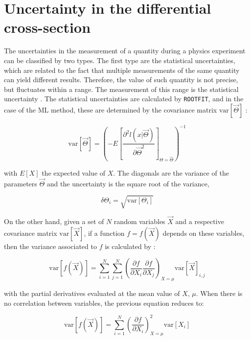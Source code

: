  \cleardoublepage
\section{Uncertainty in the differential cross-section}
The uncertainties in the measurement of a quantity during a physics experiment can be classified by two types. The first type are the statistical uncertainties, which are related to the fact that multiple measurements of the same quantity can yield different results. Therefore, the value of such quantity is not precise, but fluctuates within a range. The measurement of this range is the statistical uncertainty \cite{sinervo2003definition}. The statistical uncertainties are calculated by \verb|ROOTFIT|, and in the case of the ML method, these are determined by the covariance matrix $\mathrm{var}[\vec{\Theta}]$ \cite{vsirca2016probability}:

\begin{equation}
	\mathrm{var}[\vec{\Theta}] = 
	\left(-E\left[ \frac{\partial^2 l(x | \vec{\Theta}) }{\partial \vec{\Theta} ^2}\right]_{\Theta = \hat{\Theta}}\right)^{-1}
\end{equation}

with $E[X]$ the expected value of $X$. The diagonals are the variance of the parameters $\vec{\Theta}$ and the uncertainty is the square root of the variance, 

\begin{equation}
	\delta \Theta_i = \sqrt{\mathrm{var}[\Theta_i]}
\end{equation}

On the other hand, given a set of $N$ random variables $\vec{X}$ and a respective covariance matrix $\mathrm{var}[\vec{X}]$, if a function $f = f(\vec{X})$ depends on these variables, then the variance associated to $f$ is calculated by \cite{vsirca2016probability}:

\begin{equation}
	\mathrm{var}[f(\vec{X})] = \sum_{i=1}^N \sum_{j=1}^N \left(\frac{\partial f}{\partial X_i} \frac{\partial f}{\partial X_j} \right)_{X = \mu} \mathrm{var}[\vec{X}]_{i,j}
\end{equation}

with the partial derivatives evaluated at the mean value of $X$, $\mu$. When there is no correlation between variables, the previous equation reduces to:

\begin{equation}
	\label{totaluncertainty}
	\mathrm{var}[f(\vec{X})] = \sum_{i=1}^N  \left(\frac{\partial f}{\partial X_i}\right)^2_{X = \mu} \mathrm{var}[X_i]
\end{equation}

